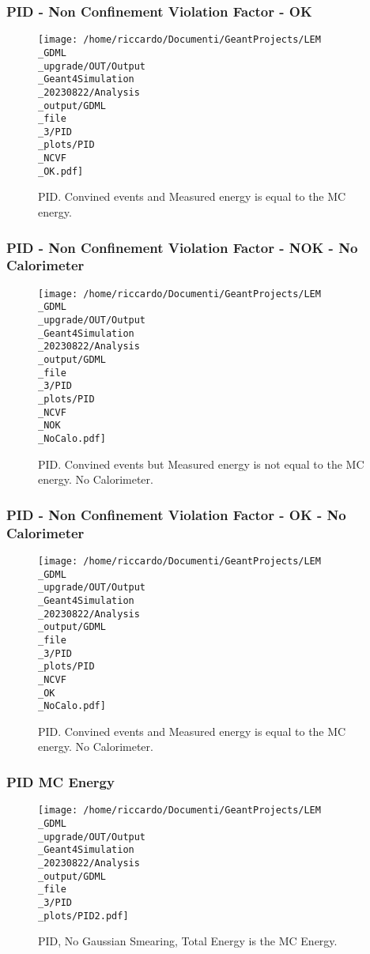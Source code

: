 \documentclass[8pt]{beamer}
\begin{document}
            \begin{frame}
                \frametitle{PID - Non Confinement Violation Factor - OK}
            
        \begin{figure}[h]
            \centering
            \texttt{[image: /home/riccardo/Documenti/GeantProjects/LEM\\\_GDML\\\_upgrade/OUT/Output\\\_Geant4Simulation\\\_20230822/Analysis\\\_output/GDML\\\_file\\\_3/PID\\\_plots/PID\\\_NCVF\\\_OK.pdf]}
            \caption{PID. Convined events and Measured energy is equal to the MC energy.}
        \end{figure}
        
            \end{frame}
            
            \begin{frame}
                \frametitle{PID - Non Confinement Violation Factor - NOK - No Calorimeter}
            
        \begin{figure}[h]
            \centering
            \texttt{[image: /home/riccardo/Documenti/GeantProjects/LEM\\\_GDML\\\_upgrade/OUT/Output\\\_Geant4Simulation\\\_20230822/Analysis\\\_output/GDML\\\_file\\\_3/PID\\\_plots/PID\\\_NCVF\\\_NOK\\\_NoCalo.pdf]}
            \caption{PID. Convined events but Measured energy is not equal to the MC energy. No Calorimeter.}
        \end{figure}
        
            \end{frame}
            
            \begin{frame}
                \frametitle{PID - Non Confinement Violation Factor - OK - No Calorimeter}
            
        \begin{figure}[h]
            \centering
            \texttt{[image: /home/riccardo/Documenti/GeantProjects/LEM\\\_GDML\\\_upgrade/OUT/Output\\\_Geant4Simulation\\\_20230822/Analysis\\\_output/GDML\\\_file\\\_3/PID\\\_plots/PID\\\_NCVF\\\_OK\\\_NoCalo.pdf]}
            \caption{PID. Convined events and Measured energy is equal to the MC energy. No Calorimeter.}
        \end{figure}
        
            \end{frame}
            
            \begin{frame}
                \frametitle{PID MC Energy}
            
        \begin{figure}[h]
            \centering
            \texttt{[image: /home/riccardo/Documenti/GeantProjects/LEM\\\_GDML\\\_upgrade/OUT/Output\\\_Geant4Simulation\\\_20230822/Analysis\\\_output/GDML\\\_file\\\_3/PID\\\_plots/PID2.pdf]}
            \caption{PID, No Gaussian Smearing, Total Energy is the MC Energy.}
        \end{figure}
        
            \end{frame}
            
\end{document}
